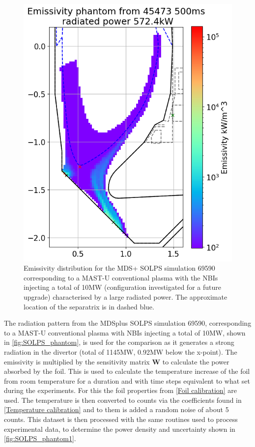 \begin{figure}
	\centering
	\includegraphics[trim={0 0 0 45},clip,width=0.5\linewidth]{Chapters/chapter2/figs/inversion_comparison_phantom_SOLPS_pantom_test.png}
	\caption{Emissivity distribution for the MDS+ SOLPS simulation 69590 corresponding to a MAST-U conventional plasma with the NBIs injecting a total of 10MW (configuration investigated for a future upgrade) characterised by a large radiated power. The approximate location of the separatrix is in dashed blue.}
	\label{fig:SOLPS_phantom}
\end{figure}

The radiation pattern from the MDSplus\cite{MDSplus2020} SOLPS simulation 69590, corresponding to a MAST-U conventional plasma with NBIs injecting a total of 10MW, shown in \autoref{fig:SOLPS_phantom}, is used for the comparison as it generates a strong radiation in the divertor (total of 1145MW, 0.92MW below the x-point). The emissivity is multiplied by the sensitivity matrix $\bm{W}$ to calculate the power absorbed by the foil. This is used to calculate the temperature increase of the foil from room temperature for a duration and with time steps equivalent to what set during the experiments. For this the foil properties from \autoref{Foil calibration} are used. The temperature is then converted to counts via the coefficients found in \autoref{Temperature calibration} and to them is added a random noise of about 5 counts. This dataset is then processed with the same routines used to process experimental data, to determine the power density and uncertainty shown in \autoref{fig:SOLPS_phantom1}.

